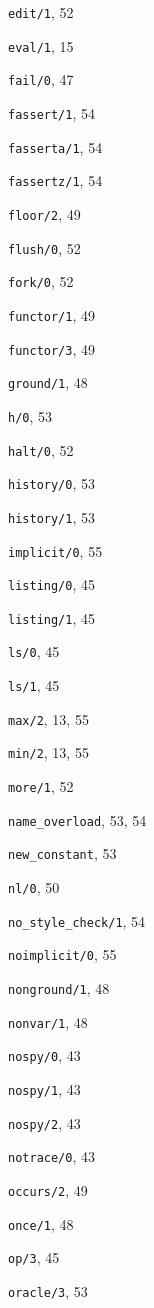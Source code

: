 \begin{theindex}
  \item {\tt edit/1}, 52
  \item {\tt eval/1}, 15
  \item {\tt fail/0}, 47
  \item {\tt fassert/1}, 54
  \item {\tt fasserta/1}, 54
  \item {\tt fassertz/1}, 54
  \item {\tt floor/2}, 49
  \item {\tt flush/0}, 52
  \item {\tt fork/0}, 52
  \item {\tt functor/1}, 49
  \item {\tt functor/3}, 49
  \item {\tt ground/1}, 48
  \item {\tt h/0}, 53
  \item {\tt halt/0}, 52
  \item {\tt history/0}, 53
  \item {\tt history/1}, 53
  \item {\tt implicit/0}, 55
  \item {\tt listing/0}, 45
  \item {\tt listing/1}, 45
  \item {\tt ls/0}, 45
  \item {\tt ls/1}, 45
  \item {\tt max/2}, 13, 55
  \item {\tt min/2}, 13, 55
  \item {\tt more/1}, 52
  \item {\tt name\_overload}, 53, 54
  \item {\tt new\_constant}, 53
  \item {\tt nl/0}, 50
  \item {\tt no\_style\_check/1}, 54
  \item {\tt noimplicit/0}, 55
  \item {\tt nonground/1}, 48
  \item {\tt nonvar/1}, 48
  \item {\tt nospy/0}, 43
  \item {\tt nospy/1}, 43
  \item {\tt nospy/2}, 43
  \item {\tt notrace/0}, 43
  \item {\tt occurs/2}, 49
  \item {\tt once/1}, 48
  \item {\tt op/3}, 45
  \item {\tt oracle/3}, 53

\end{theindex}
